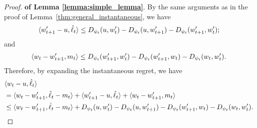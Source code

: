\begin{proof}{\textbf{of Lemma \ref{lemma:simple_lemma}}.}
By the same arguments as in the proof of Lemma~\ref{thm:general_instantaneous}, we have
\begin{align*}
\langle {w_{t+1}^\prime-u, \hat{\ell}_t} \rangle \leq D_{\psi_t}(u,w_{t}^\prime)-D_{\psi_t}(u,w_{t+1}^\prime)-D_{\psi_t}(w_{t+1}^\prime, w_{t}^\prime); 
\end{align*}
and 
\begin{align*}
\langle {w_t-w_{t+1}^\prime, m_t} \rangle \leq D_{\psi_t}(w_{t+1}^\prime, w_t^\prime)-D_{\psi_t}(w_{t+1}^\prime, w_t)-D_{\psi_t}(w_t, w_t^\prime).
\end{align*}
Therefore, by expanding the instantaneous regret, we have
\begin{align*}
&\langle {w_t-u, \hat{\ell}_t} \rangle\nonumber \\
&=\langle {w_t-w_{t+1}^\prime, \hat{\ell}_t-m_t} \rangle+\langle {w_{t+1}^\prime-u, \hat{\ell}_t} \rangle+\langle {w_t-w_{t+1}^\prime, m_t} \rangle \nonumber \\
&\leq \langle {w_t-w_{t+1}^\prime, \hat{\ell}_t-m_t} \rangle + D_{\psi_t}(u,w_{t}^\prime)-D_{\psi_t}(u,w_{t+1}^\prime)-D_{\psi_t}(w_{t+1}^\prime, w_t)-D_{\psi_t}(w_t, w_t^\prime). 
\end{align*}
\end{proof}
